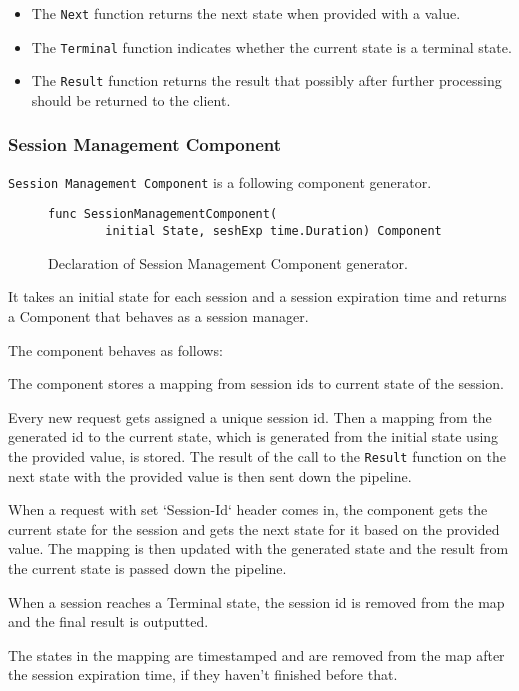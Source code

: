 \documentclass[12pt,a4paper]{article}
\begin{document}
\begin{itemize}
	\item The \texttt{Next} function returns the next state when provided with a value.
	\item The \texttt{Terminal} function indicates whether the current state is a terminal state.
	\item The \texttt{Result} function returns the result that possibly after further 
		  processing should be returned to the client.
\end{itemize}

\subsubsection{Session Management Component}
\texttt{Session Management Component} is a following component generator.

\begin{figure}[h]
\centering
\begin{lstlisting}
func SessionManagementComponent(
		initial State, seshExp time.Duration) Component
\end{lstlisting}
\caption[scale=1.0]{Declaration of Session Management Component generator.}
\label{fig:seshComp}
\end{figure}

It takes an initial state for each session and a session expiration time and 
returns a Component that behaves as a session manager. 

The component behaves as follows:

The component stores a mapping from session ids to current state of the session.

Every new request gets assigned a unique session id. Then a mapping from the generated 
id to the current state, which is generated from the initial state using the provided value,
is stored. The result of the call to the \texttt{Result} function on the next state with the provided 
value is then sent down the pipeline.

When a request with set `Session-Id` header comes in, the component gets the current 
state for the session and gets the next state for it based on the provided value.
The mapping is then updated with the generated state and the result from the current state
is passed down the pipeline.

When a session reaches a Terminal state, the session id is removed from the map
and the final result is outputted.

The states in the mapping are timestamped and are removed from the map after
the session expiration time, if they haven't finished before that.
\end{document}
